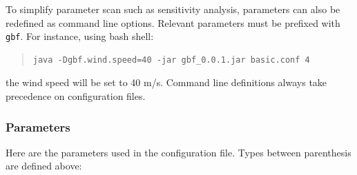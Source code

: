 \documentclass[10pt,a4paper]{article}
\begin{document}
To simplify parameter scan such as sensitivity analysis, parameters
can also be redefined as command line options. Relevant parameters
must be prefixed with \texttt{gbf}. For instance, using bash shell:

\begin{quote}
\begin{verbatim}
java -Dgbf.wind.speed=40 -jar gbf_0.0.1.jar basic.conf 4
\end{verbatim}
\end{quote}

the wind speed will be set to 40 m/s. Command line definitions always
take precedence on configuration files.

\subsubsection{Parameters}
\label{sec-4-2}

Here are the parameters used in the configuration file. Types between parenthesis are defined
above:
\end{document}
